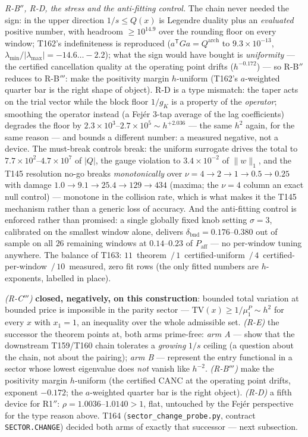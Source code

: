 \documentclass[11pt,a4paper]{article}
\begin{document}
\emph{R-B$''$, R-D, the stress and the anti-fitting control.} The chain never
needed the sign: in the upper direction $1/s\le Q(x)$ is Legendre duality
plus an \emph{evaluated} positive number, with headroom $\ge10^{14.9}$ over
the rounding floor on every window; T162's indefiniteness is reproduced
($a^{\mathsf T}Ga=Q^{\mathrm{arch}}$ to $9.3\times10^{-13}$,
$\lambda_{\min}/|\lambda_{\max}|=-14.6\ldots-2.2$); what the sign would have
bought is \emph{uniformity} --- the certified cancellation quality at the
operating point drifts ($h^{-0.172}$) --- so R-B$''$ reduces to R-B$'''$:
make the positivity margin $h$-uniform (T162's $a$-weighted quarter bar is
the right shape of object). R-D is a type mismatch: the taper acts on the
trial vector while the block floor $1/g_K$ is a property of the
\emph{operator}; smoothing the operator instead (a Fej\'er $3$-tap average of
the lag coefficients) degrades the floor by
$2.3\times10^{3}$--$2.7\times10^{5}\sim h^{+2.036}$ --- the same $h^2$ again,
for the same reason --- and bounds a different number: a measured negative,
not a device. The must-break controls break: the uniform surrogate drives the
total to $7.7\times10^{2}$--$4.7\times10^{7}$ of $|Q|$, the gauge violation
to $3.4\times10^{-2}$ of $\|w\|_1$, and the T145 resolution no-go breaks
\emph{monotonically} over $\nu=4\to2\to1\to0.5\to0.25$ with damage
$1.0\to9.1\to25.4\to129\to434$ (maxima; the $\nu=4$ column an exact null
control) --- monotone in the collision rate, which is what makes it the T145
mechanism rather than a generic loss of accuracy. And the anti-fitting
control is enforced rather than promised: a single globally fixed knob
setting $\sigma=3$, calibrated on the smallest window alone, delivers
$\delta_{\mathrm{bnd}}=0.176$--$0.380$ out of sample on all $26$ remaining
windows at $0.14$--$0.23$ of $P_{\mathrm{aff}}$ --- no per-window tuning
anywhere. The balance of T163: $11$~theorem~$/\,1$~certified-uniform~$/\,
4$~certified-per-window~$/\,10$~measured, zero fit rows (the only fitted
numbers are $h$-exponents, labelled in place).

\begin{keybox}
\emph{(R-C$'''$)} \textbf{closed, negatively, on this construction}: bounded
total variation at bounded price is impossible in the parity sector ---
$\mathrm{TV}(x)\ge1/\mu^P_1\sim h^2$ for every $x$ with $x_1=1$, an
inequality over the whole admissible set. \emph{(R-E)} the successor the
theorem points at, both arms prime-free: \emph{arm A} --- show that the
downstream T159/T160 chain tolerates a \emph{growing} $1/s$ ceiling (a
question about the chain, not about the pairing); \emph{arm B} --- represent
the entry functional in a sector whose lowest eigenvalue does \emph{not}
vanish like $h^{-2}$. \emph{(R-B$'''$)} make the positivity margin
$h$-uniform (the certified $\mathrm{CANC}$ at the operating point drifts,
exponent $-0.172$; the $a$-weighted quarter bar is the right object).
\emph{(R-D)} a fifth device for R1$''$: $\rho=1.0036$--$1.0140>1$, flat,
untouched by the Fej\'er perspective for the type reason above. T164
(\texttt{sector\_change\_probe.py}, contract \texttt{SECTOR.CHANGE}) decided
both arms of exactly that successor --- next subsection.
\end{keybox}
\end{document}
